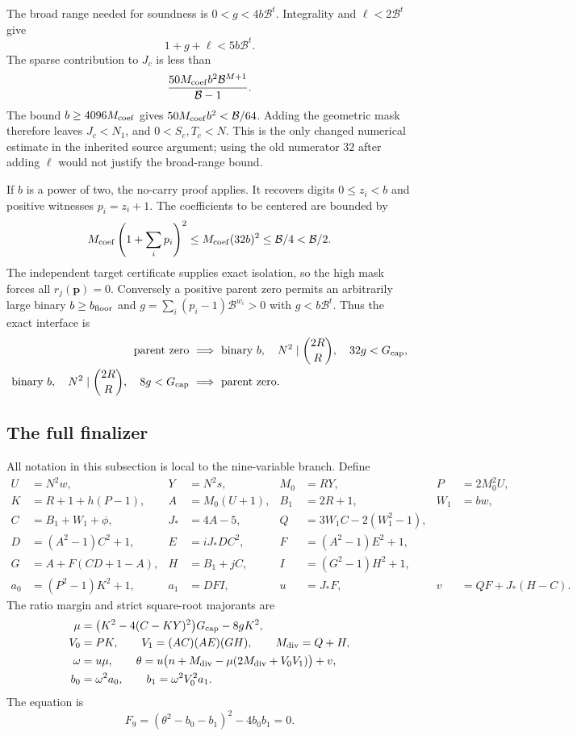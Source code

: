 \documentclass[11pt,letterpaper]{article}
\theoremstyle{remark}\newtheorem{remark}[theorem]{Remark}
\begin{document}
The broad range needed for soundness is $0<g<4b\mathcal B^t$.
Integrality and $\ell<2\mathcal B^t$ give
\[
 1+g+\ell<5b\mathcal B^t.
\]
The sparse contribution to $J_c$ is less than
\[
 \frac{50M_{\rm coef}b^2\mathcal B^{M+1}}{\mathcal B-1}.
\]
The bound $b\ge4096M_{\rm coef}$ gives
$50M_{\rm coef}b^2<\mathcal B/64$.
Adding the geometric mask therefore leaves $J_c<N_1$,
and $0<S_c,T_c<N$.
This is the only changed numerical estimate in the inherited source
argument; using the old numerator $32$ after adding $\ell$ would not
justify the broad-range bound.

If $b$ is a power of two, the no-carry proof applies.
It recovers digits $0\le z_i<b$ and positive witnesses $p_i=z_i+1$.
The coefficients to be centered are bounded by
\[
 M_{\rm coef}\left(1+\sum_i p_i\right)^2
 \le M_{\rm coef}(32b)^2
 \le\mathcal B/4<\mathcal B/2.
\]
The independent target certificate supplies exact isolation, so the
high mask forces all $r_j(\mathbf p)=0$.
Conversely a positive parent zero permits an arbitrarily large binary
$b\ge b_{\rm floor}$ and
$g=\sum_i(p_i-1)\mathcal B^{w_i}>0$ with
$g<b\mathcal B^t$. Thus the exact interface is
\begin{align*}
 \text{parent zero}&\ \Longrightarrow\
 \text{binary }b,\quad N^2\mid\binom{2R}{R},\quad32g<G_{\rm cap},\\
 \text{binary }b,\quad N^2\mid\binom{2R}{R},\quad8g<G_{\rm cap}
 &\ \Longrightarrow\ \text{parent zero}.
\end{align*}

\subsection{The full finalizer}
All notation in this subsection is local to the nine-variable branch.
Define
\begin{align*}
 U&=N^2w,&Y&=N^2s,&M_0&=RY,&P&=2M_0^2U,\\
 K&=R+1+h(P-1),&A&=M_0(U+1),&
 B_1&=2R+1,&W_1&=bw,\\
 C&=B_1+W_1+\phi,&J_*&=4A-5,&
 Q&=3W_1C-2(W_1^2-1),\\
 D&=(A^2-1)C^2+1,&E&=iJ_*DC^2,&
 F&=(A^2-1)E^2+1,\\
 G&=A+F(CD+1-A),&H&=B_1+jC,&
 I&=(G^2-1)H^2+1,\\
 a_0&=(P^2-1)K^2+1,&a_1&=DFI,&
 u&=J_*F,&v&=QF+J_*(H-C).
\end{align*}
The ratio margin and strict square-root majorants are
\begin{align*}
 \mu&=\bigl(K^2-4(C-KY)^2\bigr)G_{\rm cap}-8gK^2,\\
 V_0&=PK,\qquad V_1=(AC)(AE)(GH),\qquad M_{\rm div}=Q+H,\\
 \omega&=u\mu,\qquad
 \theta=u\bigl(n+M_{\rm div}-\mu(2M_{\rm div}+V_0V_1)\bigr)+v,\\
 b_0&=\omega^2a_0,\qquad b_1=\omega^2V_0^2a_1.
\end{align*}
The equation is
\begin{equation}\label{eq:nine-polynomial}
 \boxed{F_9=(\theta^2-b_0-b_1)^2-4b_0b_1=0.}
\end{equation}
\end{document}
